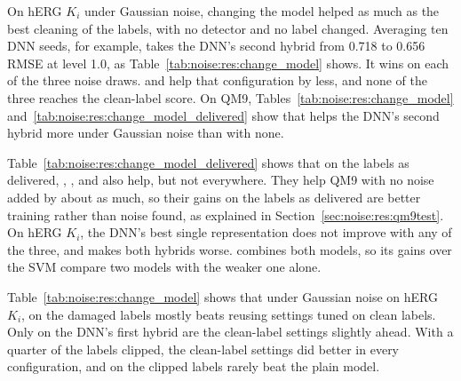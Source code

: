 On hERG $K_i$ under Gaussian noise, changing the model helped as much as the best cleaning of the labels, with no detector and no label changed. Averaging ten DNN seeds, for example, takes the DNN's second hybrid from 0.718 to 0.656 RMSE at level 1.0, as Table~\ref{tab:noise:res:change_model} shows. It wins on each of the three noise draws.  and  help that configuration by less, and none of the three reaches the clean-label score. On QM9, Tables~\ref{tab:noise:res:change_model} and~\ref{tab:noise:res:change_model_delivered} show that  helps the DNN's second hybrid more under Gaussian noise than with none.

Table~\ref{tab:noise:res:change_model_delivered} shows that on the labels as delivered, , , and  also help, but not everywhere. They help QM9 with no noise added by about as much, so their gains on the labels as delivered are better training rather than noise found, as explained in Section~\ref{sec:noise:res:qm9test}. On hERG $K_i$, the DNN's best single representation does not improve with any of the three, and  makes both hybrids worse.  combines both models, so its gains over the SVM compare two models with the weaker one alone.

Table~\ref{tab:noise:res:change_model} shows that under Gaussian noise on hERG $K_i$,  on the damaged labels mostly beats reusing settings tuned on clean labels. Only on the DNN's first hybrid are the clean-label settings slightly ahead. With a quarter of the labels clipped, the clean-label settings did better in every configuration, and  on the clipped labels rarely beat the plain model.


